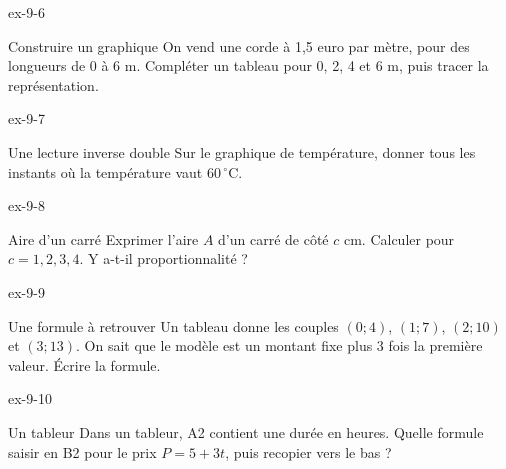 \begin{blocLivre}{ex-9-6}\begin{exercice}[2]{Construire un graphique}
On vend une corde à 1,5 euro par mètre, pour des longueurs de 0 à 6 m. Compléter un tableau pour 0, 2, 4 et 6 m, puis tracer la représentation.
\label{fig-ex-9-6}
\end{exercice}\end{blocLivre}
\begin{blocLivre}{ex-9-7}\begin{exercice}[2]{Une lecture inverse double}
Sur le graphique de température, donner tous les instants où la température vaut $60\,^\circ$C.
\label{fig-ex-9-7}
\end{exercice}\end{blocLivre}
\begin{blocLivre}{ex-9-8}\begin{exercice}[2]{Aire d’un carré}
Exprimer l’aire $A$ d’un carré de côté $c$ cm. Calculer pour $c=1,2,3,4$. Y a-t-il proportionnalité ?
\label{fig-ex-9-8}
\end{exercice}\end{blocLivre}
\begin{blocLivre}{ex-9-9}\begin{exercice}[2]{Une formule à retrouver}
Un tableau donne les couples $(0;4)$, $(1;7)$, $(2;10)$ et $(3;13)$. On sait que le modèle est un montant fixe plus 3 fois la première valeur. Écrire la formule.
\end{exercice}\end{blocLivre}
\begin{blocLivre}{ex-9-10}\begin{exercice}[2]{Un tableur}
Dans un tableur, A2 contient une durée en heures. Quelle formule saisir en B2 pour le prix $P=5+3t$, puis recopier vers le bas ?
\label{fig-ex-9-10}
\end{exercice}\end{blocLivre}

